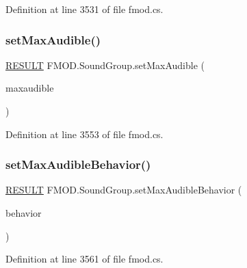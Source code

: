 Definition at line 3531 of file fmod.\+cs.

\mbox{\label{class_f_m_o_d_1_1_sound_group_ac0997b73603f4a10e8f0d211a7055065}} 
\subsubsection{\texorpdfstring{set\+Max\+Audible()}{setMaxAudible()}}
{\footnotesize\ttfamily \hyperlink{namespace_f_m_o_d_a305d1176ef3f8c8815861a60407ac33d}{R\+E\+S\+U\+LT} F\+M\+O\+D.\+Sound\+Group.\+set\+Max\+Audible (\begin{DoxyParamCaption}\item[{int}]{maxaudible }\end{DoxyParamCaption})}



Definition at line 3553 of file fmod.\+cs.

\mbox{\label{class_f_m_o_d_1_1_sound_group_ad552379d4266a3709d25d2f4c7693d98}} 
\subsubsection{\texorpdfstring{set\+Max\+Audible\+Behavior()}{setMaxAudibleBehavior()}}
{\footnotesize\ttfamily \hyperlink{namespace_f_m_o_d_a305d1176ef3f8c8815861a60407ac33d}{R\+E\+S\+U\+LT} F\+M\+O\+D.\+Sound\+Group.\+set\+Max\+Audible\+Behavior (\begin{DoxyParamCaption}\item[{\hyperlink{namespace_f_m_o_d_a94f1c442afacdfb52f62fc4ef91f425b}{S\+O\+U\+N\+D\+G\+R\+O\+U\+P\+\_\+\+B\+E\+H\+A\+V\+I\+OR}}]{behavior }\end{DoxyParamCaption})}



Definition at line 3561 of file fmod.\+cs.

\mbox{\label{class_f_m_o_d_1_1_sound_group_aaf859d2d7f883a05309de648e750ff48}} 
